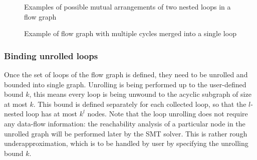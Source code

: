 \begin{figure}
\begin{subfigure}{0.18\textwidth}
\caption{} \label{fig:nested-loops-4}
\end{subfigure}
\hspace*{\fill}
\begin{subfigure}{0.18\textwidth}
\caption{} \label{fig:nested-loops-5}
\end{subfigure}
\caption{Examples of possible mutual arrangements of two nested loops in a flow graph} \label{fig:nested-loops}
\end{figure}

\begin{figure}
\centering
{}
\caption{Example of flow graph with multiple cycles merged into a single loop} \label{fig:merged-loop}
\end{figure}

\subsubsection{Binding unrolled loops}

Once the set of loops of the flow graph is defined, they need to be unrolled and bounded into single graph. Unrolling is being performed up to the user-defined bound $k$, this means every loop is being unwound to the acyclic subgraph of size at most $k$. This bound is defined separately for each collected loop, so that the $l$-nested loop has at most $k^l$ nodes. Note that the loop unrolling does not require any data-flow information: the reachability analysis of a particular node in the unrolled graph will be performed later by the SMT solver. This is rather rough underapproximation, which is to be handled by user by specifying the unrolling bound $k$.

